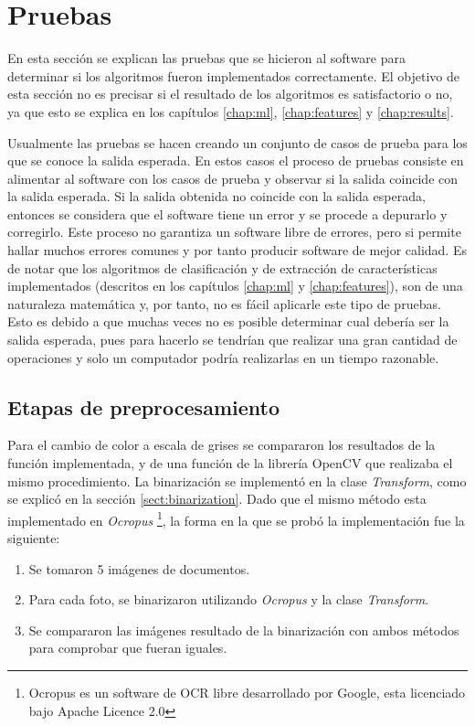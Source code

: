 \documentclass[a4paper, 11pt, oneside]{report}
\begin{document}
\section{Pruebas}

En esta sección se explican las pruebas que se hicieron al software para determinar si los algoritmos fueron implementados correctamente. El objetivo de esta sección no es precisar si el resultado de los algoritmos es satisfactorio o no, ya que esto se explica en los capítulos \ref{chap:ml}, \ref{chap:features} y \ref{chap:results}.

Usualmente las pruebas se hacen creando un conjunto de casos de prueba para los que se conoce la salida esperada. En estos casos el proceso de pruebas consiste en alimentar al software con los casos de prueba y observar si la salida coincide con la salida esperada. Si la salida obtenida no coincide con la salida esperada, entonces se considera que el software tiene un error y se procede a depurarlo y corregirlo. Este proceso no garantiza un software libre de errores, pero si permite hallar muchos errores comunes y por tanto producir software de mejor calidad. Es de notar que los algoritmos de clasificación y de extracción de características implementados (descritos en los capítulos \ref{chap:ml} y \ref{chap:features}), son de una naturaleza matemática y, por tanto, no es fácil aplicarle este tipo de pruebas. Esto es debido a que muchas veces no es posible determinar cual debería ser la salida esperada, pues para hacerlo se tendrían que realizar una gran cantidad de operaciones y solo un computador podría realizarlas en un tiempo razonable. 

\subsection{Etapas de preprocesamiento}

Para el cambio de color a escala de grises se compararon los resultados de la función implementada, y de una función de la librería OpenCV que realizaba el mismo procedimiento. La binarización se implementó en la clase {\it Transform}, como se explicó en la sección \ref{sect:binarization}. Dado que el mismo método esta implementado en {\it Ocropus} \footnote{Ocropus es un software de OCR libre desarrollado por Google, esta licenciado bajo Apache Licence 2.0}, la forma en la que se probó la implementación fue la siguiente:

	\begin{enumerate}
	\item Se tomaron 5 imágenes de documentos.
	\item Para cada foto, se binarizaron utilizando {\it Ocropus} y la clase {\it Transform}.
	\item Se compararon las imágenes resultado de la binarización con ambos métodos para comprobar que fueran iguales.
	\end{enumerate}
\end{document}
